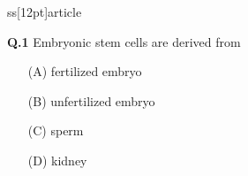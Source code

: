 ss[12pt]{article}
\usepackage[margin=1in]{geometry}



\noindent
\textbf{Q.1} \quad Embryonic stem cells are derived from
\begin{enumerate}
    \item[(A)] fertilized embryo
        \item[(B)] unfertilized embryo
	    \item[(C)] sperm
	        \item[(D)] kidney
		\end{enumerate}

		

